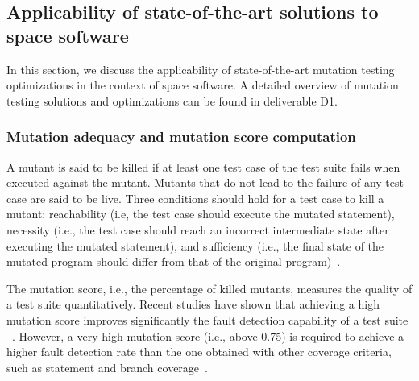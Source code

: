 
\subsection{Applicability of state-of-the-art solutions to space software}
\label{sec:background}

In this section, we discuss the applicability of state-of-the-art mutation testing optimizations in the context of space software. A detailed overview of mutation testing solutions and optimizations can be found in deliverable D1.

\subsubsection{Mutation adequacy and mutation score computation}

A mutant is said to be killed if at least one test case of the test suite fails when executed against the mutant.
Mutants that do not lead to the failure of any test case are said to be live.
Three conditions should hold for a test case to kill a mutant: reachability (i.e, the test case should execute the mutated statement), necessity (i.e., the test case should reach an incorrect intermediate state after executing the mutated statement), and sufficiency (i.e., the final state of the mutated program should differ from that of the original program)~\cite{offutt1997automatically}.

The mutation score, i.e., the percentage of killed mutants, measures the quality of a test suite quantitatively. Recent studies have shown that achieving a high mutation score improves significantly the fault detection capability of a test suite
~\cite{papadakis2018mutation}. 
However, a very high mutation score (i.e., above 0.75) is required to achieve a higher fault detection rate than the one obtained with other coverage criteria, such as statement and branch coverage~\cite{Chekam:17}.

